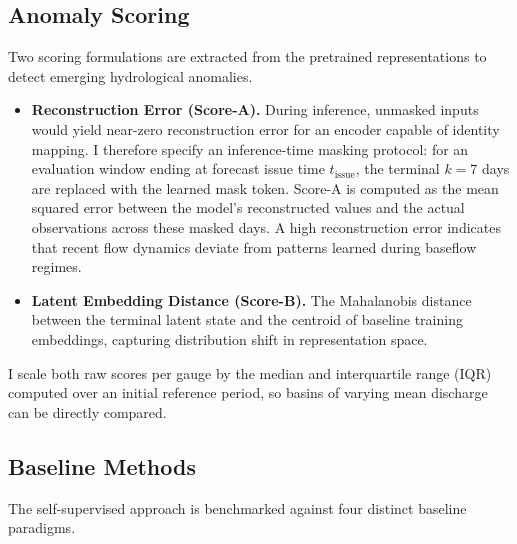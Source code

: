 \documentclass[12pt]{report}
\begin{document}
\subsection{Anomaly Scoring}

Two scoring formulations are extracted from the pretrained representations to detect emerging hydrological anomalies.

\begin{itemize}
  \item \textbf{Reconstruction Error (Score-A).} During inference, unmasked inputs would yield near-zero reconstruction error for an encoder capable of identity mapping. I therefore specify an inference-time masking protocol: for an evaluation window ending at forecast issue time $t_{\text{issue}}$, the terminal $k=7$ days are replaced with the learned mask token. Score-A is computed as the mean squared error between the model's reconstructed values and the actual observations across these masked days. A high reconstruction error indicates that recent flow dynamics deviate from patterns learned during baseflow regimes.
  \item \textbf{Latent Embedding Distance (Score-B).} The Mahalanobis distance between the terminal latent state and the centroid of baseline training embeddings, capturing distribution shift in representation space.
\end{itemize}

I scale both raw scores per gauge by the median and interquartile range (IQR) computed over an initial reference period, so basins of varying mean discharge can be directly compared.

\subsection{Baseline Methods}

The self-supervised approach is benchmarked against four distinct baseline paradigms.
\end{document}
